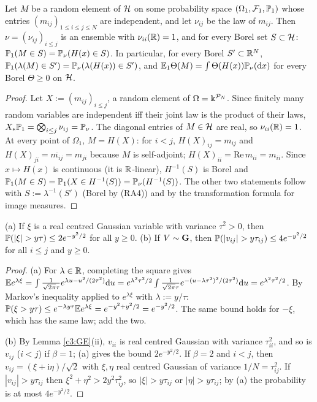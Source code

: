 \begin{auxlemma}\label{c2:transfer}
Let $M$ be a random element of $\cH$ on some probability space $(\Omega_1,\mathcal F_1,\P_1)$ whose entries $(m_{ij})_{1\le i\le j\le N}$ are independent, and let $\nu_{ij}$ be the law of $m_{ij}$. Then $\nu=(\nu_{ij})_{i\le j}$ is an ensemble with $\nu_{ii}(\R)=1$, and for every Borel set $S\subset\cH$: $\P_1(M\in S)=\PP_\nu(H(x)\in S)$.
In particular, for every Borel $S'\subset\R^N$, $\P_1(\lambda(M)\in S')=\PP_\nu(\lambda(H(x))\in S')$, and $\E_1\Theta(M)=\int\Theta(H(x))\PP_\nu(\rd x)$ for every Borel $\Theta\ge0$ on $\cH$.
\end{auxlemma}

\begin{proof}
Let $X:=(m_{ij})_{i\le j}$, a random element of $\Omega=\K^{\mathcal P_N}$. Since finitely many random variables are independent iff their joint law is the product of their laws, $X_*\P_1=\bigotimes_{i\le j}\nu_{ij}=\PP_\nu$. The diagonal entries of $M\in\cH$ are real, so $\nu_{ii}(\R)=1$.
At every point of $\Omega_1$, $M=H(X)$: for $i<j$, $H(X)_{ij}=m_{ij}$ and $H(X)_{ji}=\overline{m_{ij}}=m_{ji}$ because $M$ is self-adjoint; $H(X)_{ii}=\mathrm{Re}\,m_{ii}=m_{ii}$.
Since $x\mapsto H(x)$ is continuous (it is $\R$-linear), $H^{-1}(S)$ is Borel and $\P_1(M\in S)=\P_1(X\in H^{-1}(S))=\PP_\nu(H^{-1}(S))$. The other two statements follow with $S:=\lambda^{-1}(S')$ (Borel by (RA4)) and by the transformation formula for image measures.
\end{proof}

\begin{auxlemma}\label{c2:gausstail}
(a) If $\xi$ is a real centred Gaussian variable with variance $\tau^2>0$, then $\P(|\xi|>y\tau)\le2e^{-y^2/2}$ for all $y\ge0$.
(b) If $V\sim\bG$, then $\P(|v_{ij}|>y\tau_{ij})\le4e^{-y^2/2}$ for all $i\le j$ and $y\ge0$.
\end{auxlemma}

\begin{proof}
(a) For $\lambda\in\R$, completing the square gives $\E e^{\lambda\xi}=\int\frac{1}{\sqrt{2\pi}\tau}e^{\lambda u-u^2/(2\tau^2)}\rd u=e^{\lambda^2\tau^2/2}\int\frac{1}{\sqrt{2\pi}\tau}e^{-(u-\lambda\tau^2)^2/(2\tau^2)}\rd u=e^{\lambda^2\tau^2/2}$.
By Markov's inequality applied to $e^{\lambda\xi}$ with $\lambda:=y/\tau$: $\P(\xi>y\tau)\le e^{-\lambda y\tau}\E e^{\lambda\xi}=e^{-y^2+y^2/2}=e^{-y^2/2}$. The same bound holds for $-\xi$, which has the same law; add the two.

(b) By Lemma \ref{c3:GE}(ii), $v_{ii}$ is real centred Gaussian with variance $\tau_{ii}^2$, and so is $v_{ij}$ ($i<j$) if $\beta=1$; (a) gives the bound $2e^{-y^2/2}$. If $\beta=2$ and $i<j$, then $v_{ij}=(\xi+\mathrm i\eta)/\sqrt2$ with $\xi,\eta$ real centred Gaussian of variance $1/N=\tau_{ij}^2$.
If $|v_{ij}|>y\tau_{ij}$ then $\xi^2+\eta^2>2y^2\tau_{ij}^2$, so $|\xi|>y\tau_{ij}$ or $|\eta|>y\tau_{ij}$; by (a) the probability is at most $4e^{-y^2/2}$.
\end{proof}

